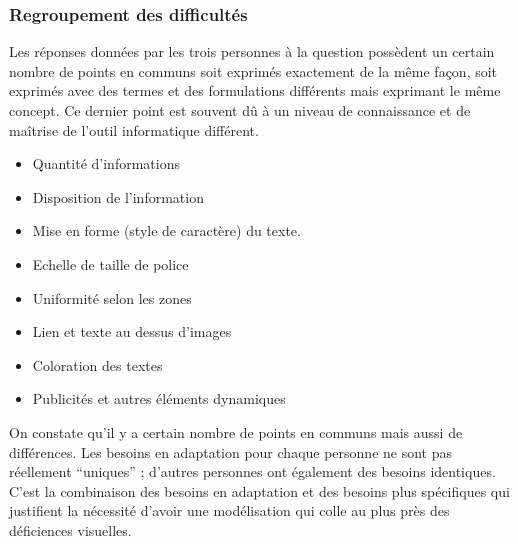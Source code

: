 \documentclass[french,a4paper]{report}
\begin{document}
{\subsubsection{Regroupement des difficultés}
Les réponses données par les trois personnes à la question possèdent
un certain nombre de points en communs soit exprimés exactement de la
même façon, soit exprimés avec des termes et des formulations
différents mais exprimant le même concept. Ce dernier point est
souvent dû à un
niveau de connaissance et de maîtrise de l'outil informatique différent.\\
\begin{itemize}\setlength{\itemsep}{0.4\baselineskip}
\item Quantité d'informations
\item Disposition de l'information
\item Mise en forme (style de caractère) du texte.
\item Echelle de taille de police
\item Uniformité selon les zones
\item Lien et texte au dessus d'images
\item Coloration des textes
\item Publicités et autres éléments dynamiques\\
\end{itemize}
On constate qu'il y a certain nombre de points en communs mais aussi
de différences. Les besoins en adaptation pour chaque personne ne
sont pas réellement \enquote{uniques} ; d'autres personnes ont également des
besoins identiques. C'est la combinaison des besoins en adaptation et
des besoins plus spécifiques qui justifient la nécessité d'avoir
une modélisation qui colle au plus près des
déficiences visuelles.\\
}
\end{document}
